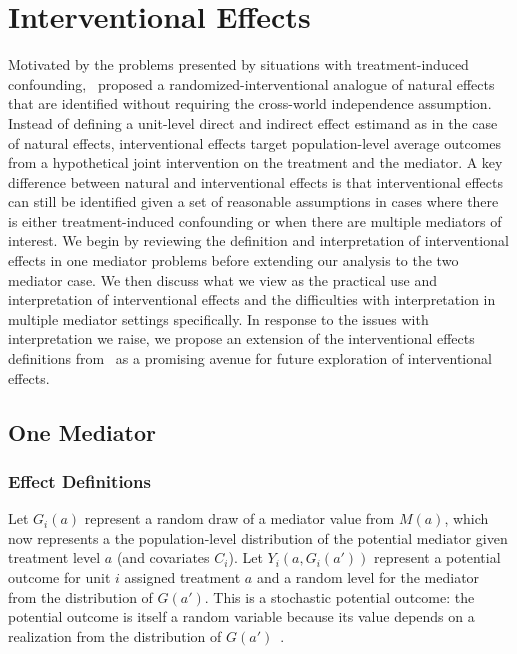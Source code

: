 \chapter{Interventional Effects}\label{chapter:interventional_effects}

Motivated by the problems presented by situations with treatment-induced confounding,~\cite{vanderweeleetal2014} 
proposed a randomized-interventional analogue of natural effects that are identified without 
requiring the cross-world independence assumption. Instead of defining 
a unit-level direct and indirect effect estimand as in the case of natural effects, interventional effects
target population-level average outcomes from a hypothetical joint intervention on the treatment and the 
mediator. A key difference between natural and interventional effects
is that interventional effects can still be identified given a set of reasonable assumptions in cases where
there is either treatment-induced confounding or when there are multiple mediators of interest. We begin by
reviewing the definition and interpretation of interventional effects in one mediator problems before 
extending our analysis to the two mediator case. We then discuss what we
view as the practical use and interpretation of interventional effects and the difficulties with 
interpretation in multiple mediator settings specifically. In response to the issues with interpretation 
we raise, we propose an extension of the interventional effects definitions from~\cite{vanderweelerobinson2014}
as a promising avenue for future exploration of interventional effects. 

\section{One Mediator}

\subsection{Effect Definitions}\label{subsection:intv_eff_defs}

Let $G_{i}(a)$ represent a random draw of a mediator value from $M(a)$, which now represents a 
the population-level distribution of the potential mediator given treatment level $a$ (and covariates $C_{i}$).
Let $Y_{i}(a,G_{i}(a'))$ represent a potential outcome for unit $i$ assigned treatment $a$ and
a random level for the mediator from the distribution of $G(a')$. This is a stochastic potential 
outcome: the potential outcome is itself a random variable because its value depends on a realization
from the distribution of $G(a')$~\citep{vanderweelerobins2012}. 

